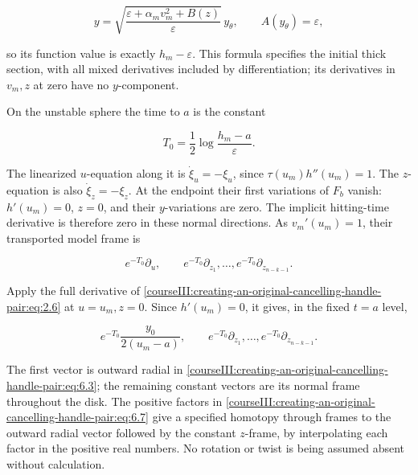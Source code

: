 \begin{equation}
y=\sqrt{\frac{\varepsilon+\alpha_m v_m^2+B(z)}{\varepsilon}}\,
       y_\theta,\qquad A(y_\theta)=\varepsilon,
 \label{courseIII:creating-an-original-cancelling-handle-pair:eq:6.4}
\end{equation}

so its function value is exactly \(h_m-\varepsilon\). This formula specifies the initial thick section, with all mixed derivatives included by differentiation; its derivatives in \(v_m,z\) at zero have no \(y\)-component.

On the unstable sphere the time to \(a\) is the constant

\begin{equation}
T_0=\frac12\log\frac{h_m-a}{\varepsilon}.
 \label{courseIII:creating-an-original-cancelling-handle-pair:eq:6.5}
\end{equation}

The linearized \(u\)-equation along it is \(\dot{\xi}_u=-\xi_u\), since \(\tau(u_m)h''(u_m)=1\). The \(z\)-equation is also \(\dot{\xi}_z=-\xi_z\). At the endpoint their first variations of \(F_b\) vanish: \(h'(u_m)=0\), \(z=0\), and their \(y\)-variations are zero. The implicit hitting-time derivative is therefore zero in these normal directions. As \(v_m'(u_m)=1\), their transported model frame is

\begin{equation}
e^{-T_0}\partial_u,\qquad
 e^{-T_0}\partial_{z_1},\ldots,e^{-T_0}\partial_{z_{n-k-1}}.
 \label{courseIII:creating-an-original-cancelling-handle-pair:eq:6.6}
\end{equation}

Apply the full derivative of \eqref{courseIII:creating-an-original-cancelling-handle-pair:eq:2.6} at \(u=u_m,z=0\). Since \(h'(u_m)=0\), it gives, in the fixed \(t=a\) level,

\begin{equation}
e^{-T_0}\frac{y_0}{2(u_m-a)},\qquad
 e^{-T_0}\partial_{z_1},\ldots,e^{-T_0}\partial_{z_{n-k-1}}.
 \label{courseIII:creating-an-original-cancelling-handle-pair:eq:6.7}
\end{equation}

The first vector is outward radial in \eqref{courseIII:creating-an-original-cancelling-handle-pair:eq:6.3}; the remaining constant vectors are its normal frame throughout the disk. The positive factors in \eqref{courseIII:creating-an-original-cancelling-handle-pair:eq:6.7} give a specified homotopy through frames to the outward radial vector followed by the constant \(z\)-frame, by interpolating each factor in the positive real numbers. No rotation or twist is being assumed absent without calculation.

